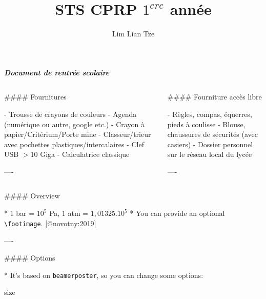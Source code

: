\documentclass{beamer}
\author[liantze@gmail.com]{Lim Lian Tze}
\title{STS CPRP $1^{ere}$ année}
\institute{Overleaf}
\begin{document}
\begin{frame}[fragile]\centering

\textbf{\textit{Document de rentrée scolaire}}

\begin{columns}
\begin{column}{0.57\textwidth}

\begin{markdown}

#### Fournitures

- Trousse de crayons de couleurs
- Agenda (numérique ou autre, google etc.)
- Crayon à papier/Critérium/Porte mine
- Classeur/trieur avec pochettes plastiques/intercalaires
- Clef USB $> 10$ Giga 
- Calculatrice classique


----
\end{markdown}
\end{column}


\begin{column}{.4\textwidth}
\begin{markdown}




#### Fourniture accès libre

- Règles, compas, équerres, pieds à coulisse
- Blouse, chaussures de sécurités (avec casiers)
- Dossier personnel sur le réseau local du lycée



----
\end{markdown}
\end{column}

\end{columns}

\bigskip
{\hrulefill}
\bigskip

\begin{columns}[T]

\begin{column}{.46\textwidth}

\begin{markdown}

#### Overview

* 1 bar = $10^{5}$ Pa, 1 atm = $1,01325.10^{5}$
* You can provide an optional \texttt{\textbackslash footimage}. [@novotny:2019]

----


#### Options

* It's based on \texttt{beamerposter}, so you can change some options:

    size
    

\end{markdown}
\end{column}
\end{columns}
\end{frame}
\end{document}
